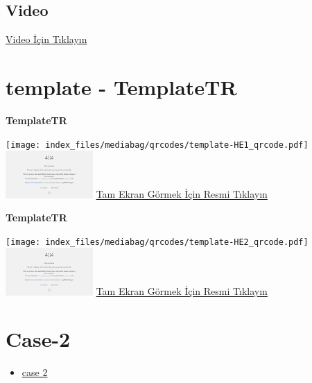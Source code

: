 \documentclass[
  letterpaper,
  DIV=11,
  numbers=noendperiod]{scrreprt}
\providecommand{\tightlist}{%
  \setlength{\itemsep}{0pt}\setlength{\parskip}{0pt}}\usepackage{longtable,booktabs,array}
\begin{document}
\hypertarget{video-1}{%
\subsection{Video}\label{video-1}}

\href{https://www.youtube.com/watch?v=nfFtViUXHqU}{Video İçin Tıklayın}

\hypertarget{sec-template}{%
\section{template - TemplateTR}\label{sec-template}}

\textbf{TemplateTR}

\texttt{[image: index\_files/mediabag/qrcodes/template-HE1\_qrcode.pdf]}
\href{https://images.patolojiatlasi.com/template/HE1.html}{\includegraphics[width=0.25\textwidth,height=\textheight]{./screenshots/thumbnail_template-HE1.png}}
\href{https://images.patolojiatlasi.com/template/HE1.html}{Tam Ekran
Görmek İçin Resmi Tıklayın}

\textbf{TemplateTR}

\texttt{[image: index\_files/mediabag/qrcodes/template-HE2\_qrcode.pdf]}
\href{https://images.patolojiatlasi.com/template/HE2.html}{\includegraphics[width=0.25\textwidth,height=\textheight]{./screenshots/thumbnail_template-HE2.png}}
\href{https://images.patolojiatlasi.com/template/HE2.html}{Tam Ekran
Görmek İçin Resmi Tıklayın}

\hypertarget{sec-hacettepe-case-of-the-month-case-2}{%
\section{Case-2}\label{sec-hacettepe-case-of-the-month-case-2}}

\begin{itemize}
\tightlist
\item
  \href{https://www.youtube.com/watch?v=xHQihI19L5g&ab_channel=KemalKosemehmetoglu}{case
  2}
\end{itemize}
\end{document}
